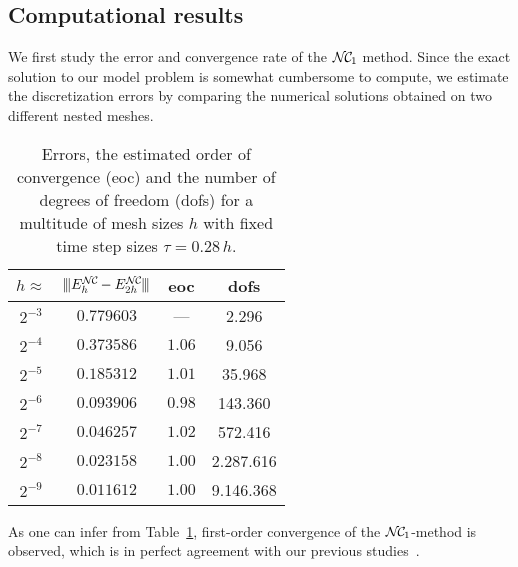 \documentclass[12pt,reqno,a4paper]{amsart}
\theoremstyle{definition}
\def\NC{\mathcal{N\mkern-2mu C\mkern-2mu}}
\newcommand{\tnorm}{{\vert\kern-0.25ex\vert\kern-0.25ex\vert}}
\begin{document}
\subsection*{Computational results}
We first study the error and convergence rate of the $\NC_1$ method.
Since the exact solution to our model problem is somewhat cumbersome to compute, we estimate the discretization errors by comparing the numerical solutions obtained on two different nested meshes. 
\begin{table}[ht!]
\begin{tabular}{c||c|c|c} 
$h\approx$ & $\tnorm E^\NC_{h}-E^\NC_{2h} \tnorm$  & eoc & dofs \\
\hline
\hline
\rule{0pt}{2.1ex}
$2^{-3}$ & $0.779603$ & ---    & 2.296 \\
$2^{-4}$ & $0.373586$ & $1.06$ & 9.056 \\
$2^{-5}$ & $0.185312$ & $1.01$ & 35.968 \\  
$2^{-6}$ & $0.093906$ & $0.98$ & 143.360 \\  
$2^{-7}$ & $0.046257$ & $1.02$ & 572.416 \\  
$2^{-8}$ & $0.023158$ & $1.00$ & 2.287.616 \\  
$2^{-9}$ & $0.011612$ & $1.00$ & 9.146.368 \\
\end{tabular}
\caption{Errors, the estimated order of convergence (eoc) and the number of degrees of freedom (dofs) for a multitude of mesh sizes $h$ with fixed time step sizes $\tau = 0.28\,h$.\label{tab:tab1}}
\end{table}
As one can infer from Table~\ref{tab:tab1}, first-order convergence of the $\NC_1$-method is observed, which is in perfect agreement with our previous studies~\cite{EggerRadu20c_maxwellyee, Radu22}.
\end{document}
